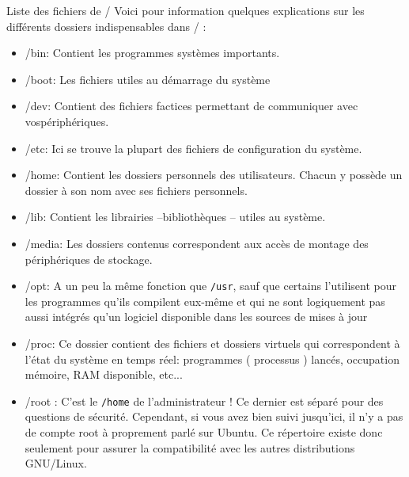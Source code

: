 \documentclass[10pt]{beamer}
\begin{document}
\begin{frame}{Liste des fichiers de /}
Voici   pour   information   quelques   explications   sur   les   différents   dossiers
indispensables dans / :
\begin{itemize}
\item \alert{/bin}: Contient les programmes systèmes importants.
\item \alert{/boot}: Les fichiers utiles au démarrage du système
\item \alert{/dev}: Contient   des   fichiers   factices   permettant   de   communiquer   avec
vospériphériques.
\item \alert{/etc}: Ici se trouve la plupart des fichiers de configuration du système.
\item \alert{/home}: Contient les dossiers personnels des utilisateurs. Chacun y possède un dossier à son nom avec ses fichiers personnels.
\item \alert{/lib}: Contient les librairies –bibliothèques – utiles au système.
\item \alert{/media}: Les dossiers contenus correspondent aux accès de montage des périphériques de stockage.
\end{itemize}
\end{frame}
\begin{frame}
\begin{itemize}
\item  \alert{/opt}: A un peu la même fonction que \texttt{/usr}, sauf que certains l'utilisent pour
les programmes qu'ils compilent eux-même et qui ne sont logiquement pas
aussi intégrés qu'un logiciel disponible dans les sources de mises à jour 
\item \alert{/proc}: Ce dossier contient des fichiers et dossiers virtuels qui correspondent à l'état du système en temps réel: programmes ( processus ) lancés, occupation mémoire, RAM disponible, etc...
\item \alert{/root} : C’est le \texttt{/home} de l’administrateur ! Ce dernier est séparé pour des
questions de sécurité. Cependant, si vous avez bien suivi jusqu'ici, il n'y a
pas de compte root à proprement parlé sur Ubuntu. Ce répertoire existe
donc seulement pour assurer la compatibilité avec les autres distributions
GNU/Linux.
\end{itemize}
\end{frame}
\end{document}
